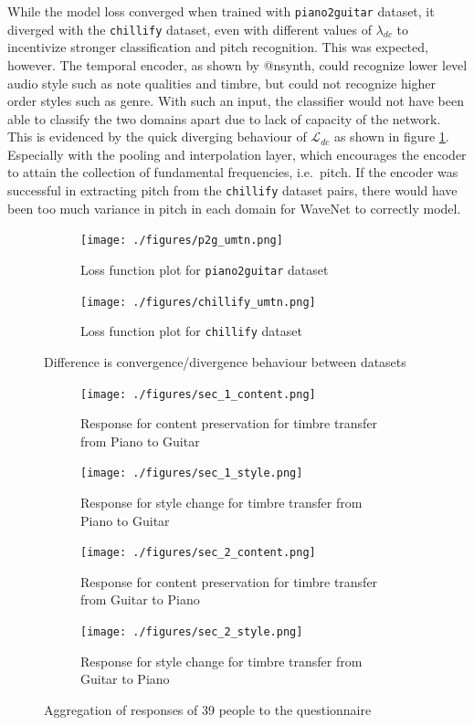 \documentclass[12pt,a4paper,]{report}
\begin{document}
While the model loss converged when trained with \texttt{piano2guitar}
dataset, it diverged with the \texttt{chillify} dataset, even with
different values of \(\lambda_{dc}\) to incentivize stronger
classification and pitch recognition. This was expected, however. The
temporal encoder, as shown by @nsynth, could recognize lower level audio
style such as note qualities and timbre, but could not recognize higher
order styles such as genre. With such an input, the classifier would not
have been able to classify the two domains apart due to lack of capacity
of the network. This is evidenced by the quick diverging behaviour of
\(\mathcal{L}_{dc}\) as shown in figure \ref{fig:umtn_loss}. Especially
with the pooling and interpolation layer, which encourages the encoder
to attain the collection of fundamental frequencies, i.e.~pitch. If the
encoder was successful in extracting pitch from the \texttt{chillify}
dataset pairs, there would have been too much variance in pitch in each
domain for WaveNet to correctly model.

\begin{figure}[]
\begin{subfigure}{.5\textwidth}
  \centering
  \texttt{[image: ./figures/p2g\_umtn.png]}  
  \caption{Loss function plot for \texttt{piano2guitar} dataset}
\end{subfigure}
\begin{subfigure}{.5\textwidth}
  \centering
  \texttt{[image: ./figures/chillify\_umtn.png]}  
  \caption{Loss function plot for \texttt{chillify} dataset}
\end{subfigure}
\caption{Difference is convergence/divergence behaviour between datasets}
\label{fig:umtn_loss}
\centering
\end{figure}

\begin{figure}
\begin{subfigure}{.5\textwidth}
  \centering
  \texttt{[image: ./figures/sec\_1\_content.png]}  
  \caption{Response for content preservation for timbre transfer from Piano to Guitar}
\end{subfigure}
\begin{subfigure}{.5\textwidth}
  \centering
  \texttt{[image: ./figures/sec\_1\_style.png]}  
  \caption{Response for style change for timbre transfer from Piano to Guitar}
\end{subfigure}
\begin{subfigure}{.5\textwidth}
  \centering
  \texttt{[image: ./figures/sec\_2\_content.png]}  
  \caption{Response for content preservation for timbre transfer from Guitar to Piano}
\end{subfigure}
\begin{subfigure}{.5\textwidth}
  \centering
  \texttt{[image: ./figures/sec\_2\_style.png]}  
\caption{Response for style change for timbre transfer from Guitar to Piano} \label{fig:guitarstyle}
\end{subfigure}
\caption{Aggregation of responses of 39 people to the questionnaire} \label{fig:responses}
\centering
\end{figure}
\end{document}
